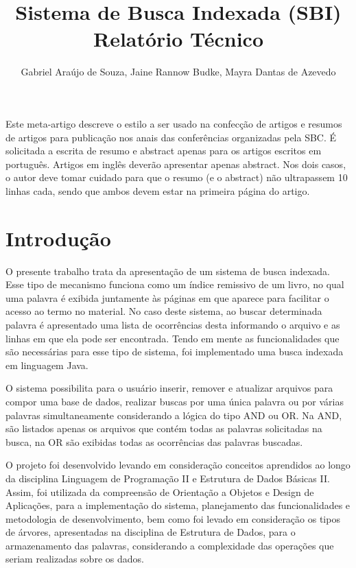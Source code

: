 \documentclass[12pt]{article}
\title{Sistema de Busca Indexada (SBI)\\ Relatório Técnico}
\author{Gabriel Araújo de Souza\inst{1}, Jaine Rannow Budke\inst{2}, Mayra Dantas de Azevedo\inst{3} }
\begin{document}
 

\maketitle

\begin{resumo} 
  Este meta-artigo descreve o estilo a ser usado na confecção de artigos e
  resumos de artigos para publicação nos anais das conferências organizadas
  pela SBC. É solicitada a escrita de resumo e abstract apenas para os artigos
  escritos em português. Artigos em inglês deverão apresentar apenas abstract.
  Nos dois casos, o autor deve tomar cuidado para que o resumo (e o abstract)
  não ultrapassem 10 linhas cada, sendo que ambos devem estar na primeira
  página do artigo.
\end{resumo}

\section{Introdução}

O presente trabalho trata da apresentação de um sistema de busca indexada. Esse tipo de mecanismo funciona como um índice remissivo de um livro, no qual uma palavra é exibida juntamente às páginas em que aparece para facilitar o acesso ao termo no material. No caso deste sistema, ao buscar determinada palavra é apresentado uma lista de ocorrências desta informando o arquivo e as linhas em que ela pode ser encontrada. Tendo em mente as funcionalidades que são necessárias para esse tipo de sistema, foi implementado uma busca indexada em linguagem Java.

O sistema possibilita para o usuário inserir, remover e atualizar arquivos para compor uma base de dados, realizar buscas por uma única palavra ou por várias palavras simultaneamente considerando a lógica do tipo AND ou OR. Na AND, são listados apenas os arquivos que contém todas as palavras solicitadas na busca, na OR são exibidas todas as ocorrências das palavras buscadas.

O projeto foi desenvolvido levando em consideração conceitos aprendidos ao longo da disciplina Linguagem de Programação II e Estrutura de Dados Básicas II. Assim, foi utilizada da compreensão de Orientação a Objetos e Design de Aplicações, para a implementação do sistema, planejamento das funcionalidades e metodologia de desenvolvimento, bem como foi levado em consideração os tipos de árvores, apresentadas na disciplina de Estrutura de Dados, para o armazenamento das palavras, considerando a complexidade das operações que seriam realizadas sobre os dados.
\end{document}
